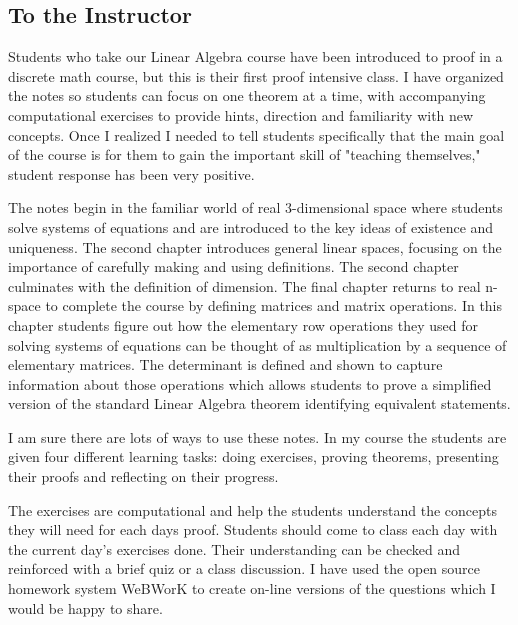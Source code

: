 \begin{annotation}
	
\chapter{To the Instructor}
Students who take our Linear Algebra course have been introduced to proof in a discrete math course, but this is their first proof intensive class. I have organized the notes so students can focus on one theorem at a time, with accompanying computational exercises to provide hints, direction and familiarity with new concepts. Once I realized I needed to tell students specifically that the main goal of the course is for them to gain the important skill of "teaching themselves," student response has been very positive.

The notes begin in the familiar world of real 3-dimensional space where students solve systems of equations and are introduced to the key ideas of existence and uniqueness. The second chapter introduces general linear spaces, focusing on the importance of carefully making and using definitions. The second chapter culminates with the definition of dimension.  The final chapter returns to real n-space to complete the course by defining matrices and matrix operations. In this chapter students figure out how the elementary row operations they used for solving systems of equations can be thought of as multiplication by a sequence of elementary matrices. The determinant is defined and shown to capture information about those operations which allows students to prove a simplified version of the standard Linear Algebra  theorem identifying  equivalent statements.  

I am sure there are lots of ways to use these notes. In my course the students are given four different learning tasks:  doing exercises, proving theorems, presenting their proofs and reflecting on their progress. 

The exercises are computational and help the students understand the concepts they will need for each days proof.  Students should come to class each day with the current day's exercises done. Their understanding can be checked and reinforced with a brief quiz or a class discussion. I have used the open source homework system WeBWorK to create on-line versions of the questions which I would be happy to share. 


\end{annotation}
